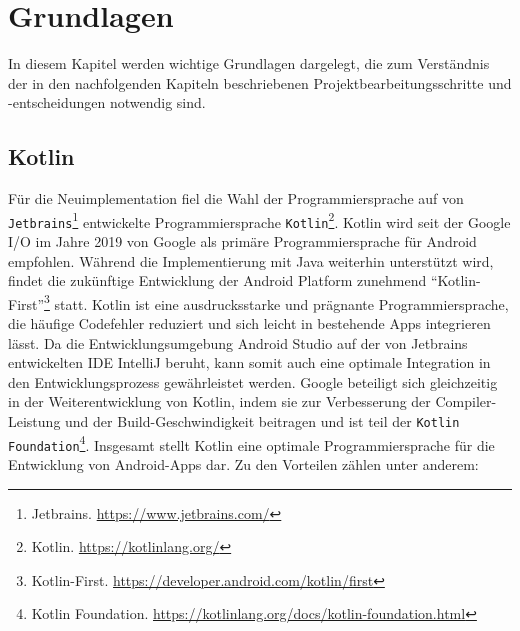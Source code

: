 \chapter{Grundlagen}\label{ch:grundlagen}

In diesem Kapitel werden wichtige Grundlagen dargelegt, die zum Verständnis der in den nachfolgenden Kapiteln beschriebenen Projektbearbeitungsschritte und -entscheidungen notwendig sind.

\section{Kotlin}\label{sec:kotlin}

Für die Neuimplementation fiel die Wahl der Programmiersprache auf von \texttt{Jetbrains}\footnote{Jetbrains. \url{https://www.jetbrains.com/}} entwickelte Programmiersprache \texttt{Kotlin}\footnote{Kotlin. \url{https://kotlinlang.org/}}. Kotlin wird seit der Google I/O im Jahre 2019 von Google als primäre Programmiersprache für Android empfohlen. Während die Implementierung mit Java weiterhin unterstützt wird, findet die zukünftige Entwicklung der Android Platform zunehmend \enquote{Kotlin-First}\footnote{Kotlin-First. \url{https://developer.android.com/kotlin/first}} statt. Kotlin ist eine ausdrucksstarke und prägnante Programmiersprache, die häufige Codefehler reduziert und sich leicht in bestehende Apps integrieren lässt. Da die Entwicklungsumgebung Android Studio auf der von Jetbrains entwickelten IDE IntelliJ beruht, kann somit auch eine optimale Integration in den Entwicklungsprozess gewährleistet werden. Google beteiligt sich gleichzeitig in der Weiterentwicklung von Kotlin, indem sie zur Verbesserung der Compiler-Leistung und der Build-Geschwindigkeit beitragen und ist teil der \texttt{Kotlin Foundation}\footnote{Kotlin Foundation. \url{https://kotlinlang.org/docs/kotlin-foundation.html}}. Insgesamt stellt Kotlin eine optimale Programmiersprache für die Entwicklung von Android-Apps dar. Zu den Vorteilen zählen unter anderem:   

